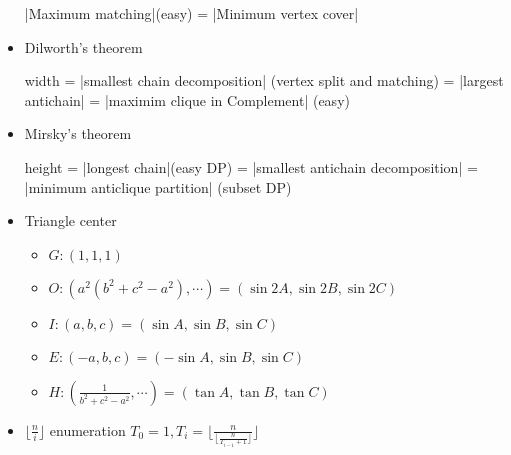 \begin{itemize}
    |Maximum matching|(easy) = |Minimum vertex cover|

    \item Dilworth's theorem

    width = |smallest chain decomposition| (vertex split and matching) = |largest antichain| = |maximim clique in Complement| (easy)

    \item Mirsky's theorem

    height = |longest chain|(easy DP) = |smallest antichain decomposition| = |minimum anticlique partition| (subset DP)

    \item Triangle center
    
    \begin{itemize}
    \item $G : (1,1,1)$
    \item $O : (a^2(b^2+c^2-a^2), \cdots)=(\sin 2A, \sin 2B, \sin 2C)$
    \item $I : (a,b,c)=(\sin A, \sin B, \sin C)$
    \item $E : (-a, b, c)=(-\sin A, \sin B, \sin C)$
    \item $H : (\frac{1}{b^2+c^2-a^2}, \cdots)=(\tan A,\tan B,\tan C)$
	\end{itemize}
	
	\item $\lfloor \frac{n}{i} \rfloor$ enumeration
	$T_0=1, T_i = \lfloor \frac{n}{\lfloor \frac{n}{T_{i-1}+1}\rfloor } \rfloor$



    

\end{itemize}
